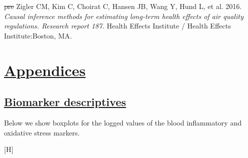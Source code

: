 \documentclass[
  letterpaper,
  DIV=11,
  numbers=noendperiod]{scrartcl}
\makeatletter
\newlength{\cslhangindent}
\newenvironment{CSLReferences}[2] %
 {\begin{list}{}{%
  \setlength{\itemindent}{0pt} %
  \setlength{\leftmargin}{0pt} %
  \setlength{\parsep}{0pt} %
  \ifodd #1
   \setlength{\leftmargin}{\cslhangindent} %
   \setlength{\itemindent}{-1\cslhangindent} %
  \fi
  \setlength{\itemsep}{#2\baselineskip}}} %
 {\end{list}} %
\renewenvironment{figure}%
   {\renewcommand\familydefault\sfdefault
    \@float{figure}}
   {\end@float}
\providecommand{\DIFadd}[1]{{\protect\color{blue}\underline{#1}}} %
\providecommand{\DIFdel}[1]{{\protect\color{red}\sout{#1}}}                      %
\providecommand{\DIFaddbegin}{} %
\providecommand{\DIFaddend}{} %
\providecommand{\DIFdelbegin}{} %
\providecommand{\DIFdelend}{} %
\providecommand{\DIFaddbeginFL}{} %
\providecommand{\DIFaddendFL}{} %
\providecommand{\DIFdelbeginFL}{} %
\providecommand{\DIFdelendFL}{} %
\newcommand{\DIFscaledelfig}{0.5}
\newlength{\DIFdelgraphicswidth} %
\newlength{\DIFdelgraphicsheight} %
\newcommand{\DIFaddincludegraphics}[2][]{{\color{blue}\fbox{\DIFOincludegraphics[#1]{#2}}}} %
\newcommand{\DIFdelincludegraphics}[2][]{%
\sbox{\DIFdelgraphicsbox}{\DIFOincludegraphics[#1]{#2}}%
\settoboxwidth{\DIFdelgraphicswidth}{\DIFdelgraphicsbox} %
\settoboxtotalheight{\DIFdelgraphicsheight}{\DIFdelgraphicsbox} %
\scalebox{\DIFscaledelfig}{%
\parbox[b]{\DIFdelgraphicswidth}{\usebox{\DIFdelgraphicsbox}\\[-\baselineskip] \rule{\DIFdelgraphicswidth}{0em}}\llap{\resizebox{\DIFdelgraphicswidth}{\DIFdelgraphicsheight}{%
\setlength{\unitlength}{\DIFdelgraphicswidth}%
\begin{picture}(1,1)%
\thicklines\linethickness{2pt} %
{\color[rgb]{1,0,0}\put(0,0){\framebox(1,1){}}}%
{\color[rgb]{1,0,0}\put(0,0){\line( 1,1){1}}}%
{\color[rgb]{1,0,0}\put(0,1){\line(1,-1){1}}}%
\end{picture}%
}\hspace*{3pt}}} %
} %
\DeclareRobustCommand{\DIFaddbegin}{\DIFOaddbegin \let\includegraphics\DIFaddincludegraphics} %
\DeclareRobustCommand{\DIFaddend}{\DIFOaddend \let\includegraphics\DIFOincludegraphics} %
\DeclareRobustCommand{\DIFdelbegin}{\DIFOdelbegin \let\includegraphics\DIFdelincludegraphics} %
\DeclareRobustCommand{\DIFdelend}{\DIFOaddend \let\includegraphics\DIFOincludegraphics} %
\DeclareRobustCommand{\DIFaddbeginFL}{\DIFOaddbeginFL \let\includegraphics\DIFaddincludegraphics} %
\DeclareRobustCommand{\DIFaddendFL}{\DIFOaddendFL \let\includegraphics\DIFOincludegraphics} %
\DeclareRobustCommand{\DIFdelbeginFL}{\DIFOdelbeginFL \let\includegraphics\DIFdelincludegraphics} %
\DeclareRobustCommand{\DIFdelendFL}{\DIFOaddendFL \let\includegraphics\DIFOincludegraphics} %
\makeatother
\begin{document}
\begin{CSLReferences}{1}{1}
\DIFdelbegin %
\DIFdel{pre}%
\DIFdelend \DIFaddbegin {}
\DIFaddend Zigler CM, Kim C, Choirat C, Hansen JB, Wang Y, Hund L, et al. 2016.
\emph{Causal inference methods for estimating long-term health effects
of air quality regulations. {Research} report 187.} Health Effects
Institute / Health Effects Institute:Boston, MA.

\end{CSLReferences}

\newpage
\appendix
\renewcommand{\thefigure}{A\arabic{figure}}
\renewcommand{\thetable}{A\arabic{table}}
\setcounter{figure}{0}
\setcounter{table}{0}

\DIFdelbegin %
\DIFdelend \DIFaddbegin \section{\DIFadd{Appendices}}\label{appendices}
\DIFaddend 

\DIFdelbegin %
\DIFdelend \DIFaddbegin \subsection{\DIFadd{Biomarker descriptives}}\label{biomarker-descriptives}
\DIFaddend 

Below we show boxplots for the logged values of the blood inflammatory
and oxidative stress markers.

\begin{figure}[H]

\DIFdelbeginFL %


\DIFdelendFL \caption{\label{fig-afig-biomarkers}Boxplots for markers of systemic
inflammation including C-reactive protein (CRP), interleukin-6 (IL-6),
tumour necrosis factor alpha (TNF-\(\alpha\)) and markers of oxidative
stress including 8-hydroxy-2'-deoxyguanosine (8-OHdG) and
malondialdehyde (MDA)}

\DIFaddbeginFL {}

\DIFaddendFL \end{figure}%
\end{document}
